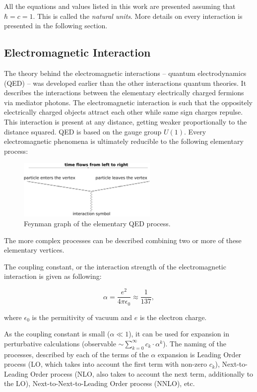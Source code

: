 All the equations and values listed in this work are presented assuming that $\hbar = c = 1$. This is called the \textit{natural units}. 
More details on every interaction is presented in the following section.

\subsection{Electromagnetic Interaction}

The theory behind the electromagnetic interactions -- quantum electrodynamics (QED) \cite{PhysRev.75.486} -- was developed earlier than the other 
interactions quantum theories. It describes the interactions between the elementary electrically charged fermions via mediator photons.
The electromagnetic interaction is such that the oppositely electrically charged objects attract each other while same sign charges repulse.
This interaction is present at any distance, getting weaker proportionally to the distance squared. QED is based on the gauge group $U(1)$.
Every electromagnetic phenomena is ultimately reducible to the following elementary process:

\begin{figure}[h]
  \centering
  \includegraphics[width=0.6\textwidth]{01_Theory_SM/plots/QED_simple_uniform.png}
  \caption{Feynman graph of the elementary QED process.}
  \label{fig:QED_simple}
\end{figure}

The more complex processes can be described combining two or more of these elementary vertices.

The coupling constant, or the interaction strength of the electromagnetic interaction is given as following:

\begin{equation}
 \alpha = \frac{e^{2}}{4\pi\epsilon_{0}} \approx \frac{1}{137},
\end{equation}

where $\epsilon_{0}$ is the permitivity of vacuum and $e$ is the electron charge.

As the coupling constant is small ($\alpha \ll 1$), it can be used for expansion in perturbative calculations (observable $\sim\sum_{k=0}^{\infty} c_{k}\cdot\alpha^{k}$).
The naming of the processes, described by each of the terms of the $\alpha$ expansion
is Leading Order process (LO, which takes into account the first term with non-zero $c_{k}$), Next-to-Leading Order process (NLO, also takes
to account the next term, additionally to the LO), Next-to-Next-to-Leading Order process (NNLO), etc.


